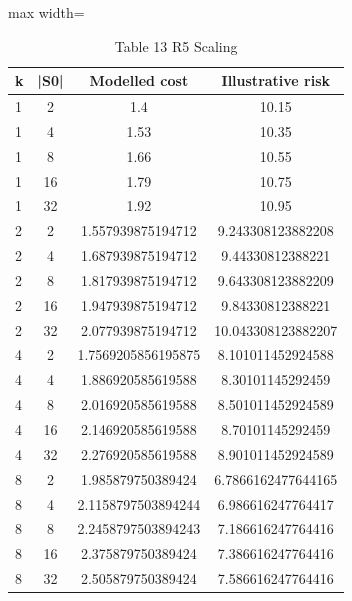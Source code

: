 \begin{table}[tbp]
\centering
\footnotesize
\caption{Table 13 R5 Scaling}
\label{tab:table_13_r5_scaling}
\begin{adjustbox}{max width=\linewidth}
\begin{tabular}{lccc}
\toprule
k & |S0| & Modelled cost & Illustrative risk \\
\midrule
1 & 2 & 1.4 & 10.15 \\
1 & 4 & 1.53 & 10.35 \\
1 & 8 & 1.66 & 10.55 \\
1 & 16 & 1.79 & 10.75 \\
1 & 32 & 1.92 & 10.95 \\
2 & 2 & 1.557939875194712 & 9.243308123882208 \\
2 & 4 & 1.687939875194712 & 9.44330812388221 \\
2 & 8 & 1.817939875194712 & 9.643308123882209 \\
2 & 16 & 1.947939875194712 & 9.84330812388221 \\
2 & 32 & 2.077939875194712 & 10.043308123882207 \\
4 & 2 & 1.7569205856195875 & 8.101011452924588 \\
4 & 4 & 1.886920585619588 & 8.30101145292459 \\
4 & 8 & 2.016920585619588 & 8.501011452924589 \\
4 & 16 & 2.146920585619588 & 8.70101145292459 \\
4 & 32 & 2.276920585619588 & 8.901011452924589 \\
8 & 2 & 1.985879750389424 & 6.7866162477644165 \\
8 & 4 & 2.1158797503894244 & 6.986616247764417 \\
8 & 8 & 2.2458797503894243 & 7.186616247764416 \\
8 & 16 & 2.375879750389424 & 7.386616247764416 \\
8 & 32 & 2.505879750389424 & 7.586616247764416 \\
\bottomrule
\end{tabular}
\end{adjustbox}
\end{table}
